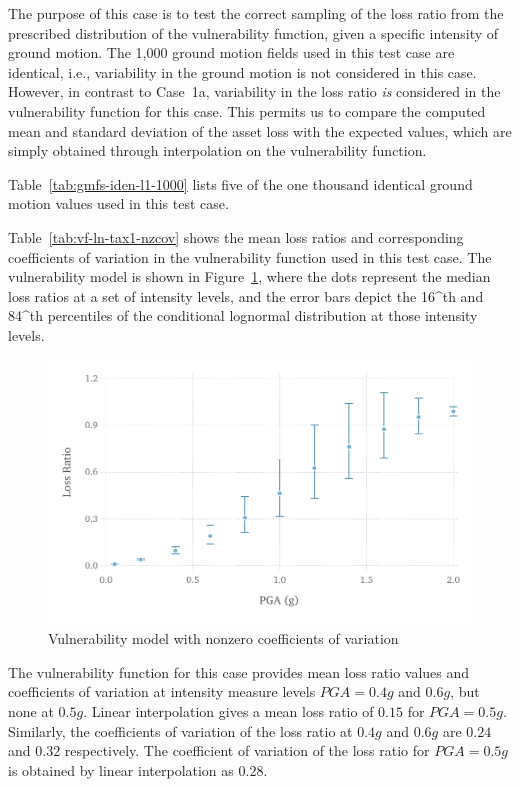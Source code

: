 The purpose of this case is to test the correct sampling of the loss ratio from the prescribed distribution of the vulnerability function, given a specific intensity of ground motion. The 1,000 ground motion fields used in this test case are identical, i.e., variability in the ground motion is not considered in this case. However, in contrast to Case~1a, variability in the loss ratio \emph{is} considered in the vulnerability function for this case. This permits us to compare the computed mean and standard deviation of the asset loss with the expected values, which are simply obtained through interpolation on the vulnerability function.



Table~\ref{tab:gmfs-iden-l1-1000} lists five of the one thousand identical ground motion values used in this test case.



Table~\ref{tab:vf-ln-tax1-nzcov} shows the mean loss ratios and corresponding coefficients of variation in the vulnerability function used in this test case. The vulnerability model is shown in Figure~\ref{fig:vf-ln-tax1-nzcov}, where the dots represent the median loss ratios at a set of intensity levels, and the error bars depict the 16^{th} and 84^{th} percentiles of the conditional lognormal distribution at those intensity levels.

\begin{figure}[htbp]
\centering
\includegraphics[width=12cm]{qareport/figures/fig-vf-ln-tax1-nzcov}
\caption{Vulnerability model with nonzero coefficients of variation}
\label{fig:vf-ln-tax1-nzcov}
\end{figure}

The vulnerability function for this case provides mean loss ratio values and coefficients of variation at intensity measure levels $PGA = 0.4 g$ and $0.6 g$, but none at $0.5 g$. Linear interpolation gives a mean loss ratio of $0.15$ for $PGA = 0.5 g$. Similarly, the coefficients of variation of the loss ratio at $0.4 g$ and $0.6 g$ are $0.24$ and $0.32$ respectively. The coefficient of variation of the loss ratio for $PGA = 0.5 g$ is obtained by linear interpolation as $0.28$.

